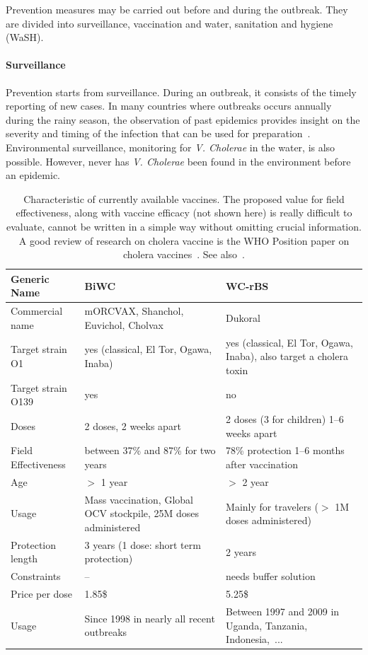 Prevention measures may be carried out before and during the outbreak. They are divided into surveillance, vaccination and water, sanitation and hygiene (WaSH).

\paragraph{Surveillance} Prevention starts from surveillance. During an outbreak, it consists of the timely reporting of new cases. In many countries where outbreaks occurs annually during the rainy season, the observation of past epidemics provides insight on the severity and timing of the infection that can be used for preparation~\cite{baracchini_seasonality_2017}. Environmental surveillance, monitoring for \textit{V. Cholerae} in the water, is also possible. However, never has \textit{V. Cholerae} been found in the environment before an epidemic.


\begin{table}[h]
\centering\small
\label{tab:prior}
\begin{tabular}{lp{50mm}p{50mm}}
\toprule
Generic Name &  BiWC & WC-rBS\\ 
\midrule
Commercial name   &  mORCVAX, Shanchol,  Euvichol, Cholvax & Dukoral  \\
Target strain O1 &   yes (classical, El Tor, Ogawa, Inaba)& yes (classical, El Tor, Ogawa, Inaba), also  target a cholera toxin  \\
Target strain O139   &  yes &      no     \\
Doses   &  2 doses, 2 weeks apart & 2 doses (3 for children) 1--6 weeks apart  \\
Field Effectiveness  & between 37\% and 87\% for two years & 78\% protection 1--6 months after vaccination\\
Age   &  $>$ 1 year & $>$ 2 year      \\
Usage & Mass vaccination, Global OCV stockpile, 25M doses administered & Mainly for travelers ($>$ 1M doses administered)\\
Protection length & 3 years (1 dose: short term protection) & 2 years\\
Constraints & -- & needs buffer solution\\
Price per dose & 1.85\$ & 5.25\$ \\ 
Usage & Since 1998 in nearly all recent outbreaks & Between 1997 and 2009 in Uganda, Tanzania, Indonesia,~... \\
\bottomrule
\end{tabular}
\caption{Characteristic of currently available vaccines. The proposed value for field effectiveness, along with vaccine efficacy (not shown here) is really difficult to evaluate, cannot be written in a simple way without omitting crucial information. A good review of research on cholera vaccine is the WHO Position paper on cholera vaccines~. See also~.}
\label{tab:vacc}
\end{table}

